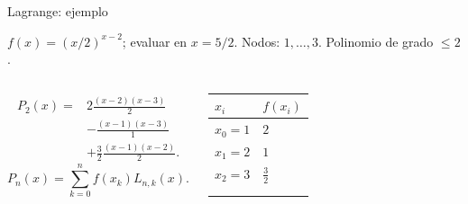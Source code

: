 \documentclass[original_version/main.tex]{subfiles}
\begin{document}
\begin{frame}[t]{Lagrange: ejemplo}
\par\noindent\begin{minipage}[t][7.5mm][t]{\textwidth}\small\strut $f(x)=(x/2)^{x-2}$; evaluar en $x=5/2$. Nodos: $1,\ldots,3$. Polinomio de grado $\le 2$.\end{minipage}\par\nointerlineskip
\begin{columns}[T]\small\setlength{\abovedisplayskip}{4pt}\setlength{\belowdisplayskip}{4pt}\small\begin{align*}
P_2(x)={}&2\frac{(x-2)(x-3)}{2}\\
&-\frac{(x-1)(x-3)}{1}\\
&+\frac32\frac{(x-1)(x-2)}{2}.
\end{align*}\[P_n(x)=\sum_{k=0}^n f(x_k)L_{n,k}(x).\]\begingroup\small\setlength{\tabcolsep}{3pt}\begin{center}\begin{tabular}{|C{.42\textwidth}|C{.42\textwidth}|}\hline
\rule[-2mm]{0pt}{6mm}$x_i$&$f(x_i)$\\\hline
\rule[-2.5mm]{0pt}{6mm}$x_0=1$&$2$\\\hline
\rule[-2.5mm]{0pt}{6mm}$x_1=2$&$1$\\\hline
\rule[-2.5mm]{0pt}{6mm}$x_2=3$&$\frac{3}{2}$\\\hline
\rule[-2.5mm]{0pt}{6mm}&\\\hline
\rule[-2.5mm]{0pt}{6mm}&\\\hline
\end{tabular}\end{center}\endgroup\par
\end{columns}
\end{frame}
\end{document}
